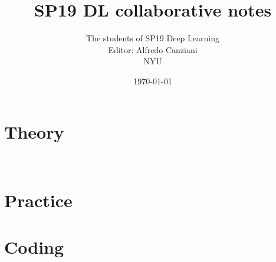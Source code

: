 \documentclass[oneside]{book}
\title{SP19 DL collaborative notes}
\author{
  The students of SP19 Deep Learning\\
  Editor: Alfredo Canziani\\
  NYU
}
\date{\today}
\begin{document}
\maketitle




\tableofcontents

\part{Theory}\label{prt:theory}


















% 


% 
 


\part{Practice}\label{prt:practice}













\part{Coding}\label{prt:coding}





% 


\end{document}
